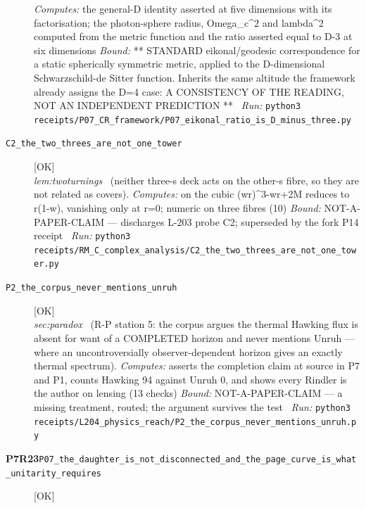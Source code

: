 \begin{description}
\emph{Computes:} the general-D identity asserted at five dimensions with its factorisation; the photon-sphere radius, Omega\_c\textasciicircum{}2 and lambda\textasciicircum{}2 computed from the metric function and the ratio asserted equal to D-3 at six dimensions
 \emph{Bound:} ** STANDARD eikonal/geodesic correspondence for a static spherically symmetric metric, applied to the D-dimensional Schwarzschild-de Sitter function. Inherits the same altitude the framework already assigns the D=4 case: A CONSISTENCY OF THE READING, NOT AN INDEPENDENT PREDICTION **
\ \emph{Run:} \texttt{python3 receipts/P07\_CR\_framework/P07\_eikonal\_ratio\_is\_D\_minus\_three.py}
\item[\label{rcpt:C2_the_two_threes_are_not_one_tower}\textbf{}\quad\texttt{C2\_the\_two\_threes\_are\_not\_one\_tower}]\hfill\textsf{[OK]}\\
\textit{lem:twoturnings} \ (neither three-s deck acts on the other-s fibre, so they are not related as covers). 
\emph{Computes:} on the cubic (wr)\textasciicircum{}3-wr+2M reduces to r(1-w), vanishing only at r=0; numeric on three fibres (10)
 \emph{Bound:} NOT-A-PAPER-CLAIM --- discharges L-203 probe C2; superseded by the fork P14 receipt
\ \emph{Run:} \texttt{python3 receipts/RM\_C\_complex\_analysis/C2\_the\_two\_threes\_are\_not\_one\_tower.py}
\item[\label{rcpt:P2_the_corpus_never_mentions_unruh}\textbf{}\quad\texttt{P2\_the\_corpus\_never\_mentions\_unruh}]\hfill\textsf{[OK]}\\
\textit{sec:paradox} \ (R-P station 5: the corpus argues the thermal Hawking flux is absent for want of a COMPLETED horizon and never mentions Unruh --- where an uncontroversially observer-dependent horizon gives an exactly thermal spectrum). 
\emph{Computes:} asserts the completion claim at source in P7 and P1, counts Hawking 94 against Unruh 0, and shows every Rindler is the author on lensing (13 checks)
 \emph{Bound:} NOT-A-PAPER-CLAIM --- a missing treatment, routed; the argument survives the test
\ \emph{Run:} \texttt{python3 receipts/L204\_physics\_reach/P2\_the\_corpus\_never\_mentions\_unruh.py}
\item[\rcptlabel{P07_the_daughter_is_not_disconnected_and_the_page_curve_is_what_unitarity_requires}{P7R23}\textbf{P7R23}\quad\texttt{P07\_the\_daughter\_is\_not\_disconnected\_and\_the\_page\_curve\_is\_what\_unitarity\_requires}]\hfill\textsf{[OK]}\\

\end{description}
